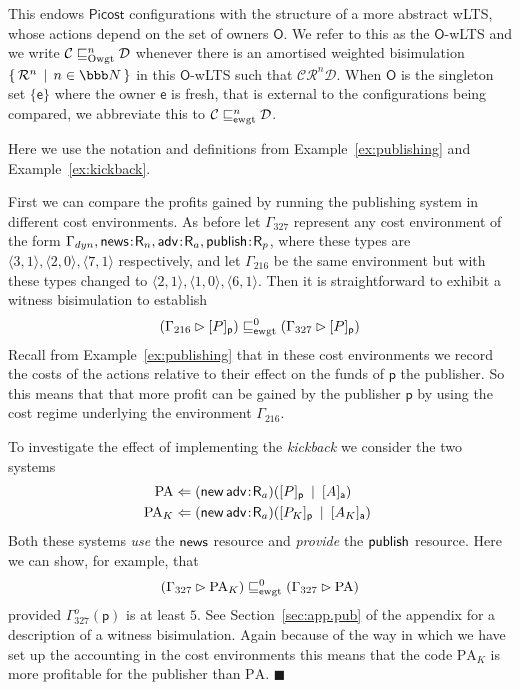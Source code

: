 \documentclass{LMCS}
\newcommand{\pfn}[1]{\mathsf{#1}}  \newcommand{\cfn}[1]{\mathsf{#1}}  \newcommand{\ownfnt}[1]{{\mathsf{#1}}}
\newcommand{\picost}{\ensuremath{\pfn{Picost}}\xspace}
\newcommand{\with}{\mathbin \rhd}
\newcommand{\nats}{\ensuremath{\bbb N}\xspace}
\newcommand{\ownO}{ {\ownfnt O}}
\newcommand{\sobs}{{\ownfnt e}}
\newcommand{\Eamort}[1]{\mathrel{\sqsubseteq_{\rm \sobs wgt}^{#1}}}
\newcommand{\Oamort}[1]{\mathrel{\sqsubseteq_{\rm Owgt}^{#1}}}
\newcommand{\Gammadyn}{\Gamma_{\scriptstyle dyn}}
\def\pair(#1,#2){\langle #1 , #2 \rangle}\newcommand{\parrow}{ \mathbin{\rightharpoonup}}
\newcommand{\setof}[2]{\{ \, #1 \, \mid \, #2 \, \}}\newcommand{\sset}[1]{\{ {#1}  \}  }
\newcommand{\typeletter}[1]{{\mathsf{#1}}}
\newcommand{\tR}{\typeletter{R}}
\newcommand{\calR}{\mathbin{\mathcal{R}}}
\newcommand{\calC}{\mathcal{C}}
\newcommand{\calD}{\mathcal{D}}
\newcommand{\Cassoc}[2]{ {{#1}\kern -0.2em : \kern -0.2em {#2}}}
\newcommand{\Cnew}[2]{(\mathop{\pfn{new}} \Cassoc{#1}{#2})}
\newcommand{\Cpar}{\mathbin{|}}
\newcommand{\Cloc}[2]{[#1]_{\ownfnt{#2}}}
\newcommand{\EndDefBox}{\null\hfill$\blacksquare$}
\newcommand{\boxHere}{\global\let\EndProof\empty\EndDefBox}
\begin{document}
\noindent
This endows \picost configurations with the structure of a more
abstract wLTS, whose actions depend on the set of owners $\ownO$.  We
refer to this as the $\ownO$-wLTS and we write $\calC \Oamort{n}
\calD$ whenever there is an amortised weighted bisimulation
$\setof{\calR^n}{n \in \nats}$ in this $\ownO$-wLTS such that $\calC
\calR^n \calD$.  When $\ownO$ is the singleton set $\sset{\sobs}$
where the owner $\sobs$ is fresh, that is  external to the
configurations being compared, we abbreviate this to $\calC \Eamort{n}
\calD$.



\begin{exa}\label{ex:publishingagain}
Here we use the notation and definitions from Example~\ref{ex:publishing} and Example~\ref{ex:kickback}.

First we can compare the profits gained by running the publishing system in different
cost environments. As before  let $\Gamma_{327}$ represent any cost environment of the
form 
$\Gammadyn, 
\Cassoc{\news}{\tR_n},
\Cassoc{\adv}{\tR_a},
\Cassoc{\publish}{\tR_p}$, where these types are
$\pair(3,1),\pair(2,0),\pair(7,1)$ respectively, and let $\Gamma_{216}$ be the same environment
but with these types changed to $\pair(2,1),\pair(1,0),\pair(6,1)$. Then it is straightforward to 
exhibit a witness bisimulation to establish
\begin{align*}
  (\Gamma_{216} \with \Cloc{P}{p}) \Eamort{0} (\Gamma_{327} \with \Cloc{P}{p})
\end{align*}
 Recall from Example~\ref{ex:publishing} that in these cost environments we record the costs of the
actions relative to their effect on the funds of $\ownfnt p$ the publisher. So this means that 
that more profit can be gained by the publisher $\ownfnt p$ by using the cost regime underlying the environment
$\Gamma_{216}$.

To investigate the effect of implementing the \emph{kickback} we consider the two systems
\begin{align*}
  \text{PA} &\Leftarrow \Cnew{\adv}{\tR_a} (\Cloc{P}{p} \;\Cpar\;\Cloc{A}{a})\\
  \text{PA}_K &\Leftarrow \Cnew{\adv}{\tR_a} (\Cloc{P_K}{p} \;\Cpar\;\Cloc{A_K}{a})\
\end{align*}
Both these systems \emph{use} the $\news$ resource and \emph{provide} the $\publish$ resource.
Here we can show, for example, that 
\begin{align*}(\Gamma_{327} \with  \text{PA}_K)  \Eamort{0} ( \Gamma_{327} \with \text{PA})
\end{align*}
provided $\Gamma_{327}^o(\ownfnt p)$ is at least $5$. See Section~\ref{sec:app.pub} of the appendix for a description of a witness
bisimulation. Again because of the way in which we have set up the accounting in the cost environments this means 
that the code $\text{PA}_K$ is more profitable for the publisher 
than $\text{PA}$. 
\boxHere 
\end{exa}
\end{document}
